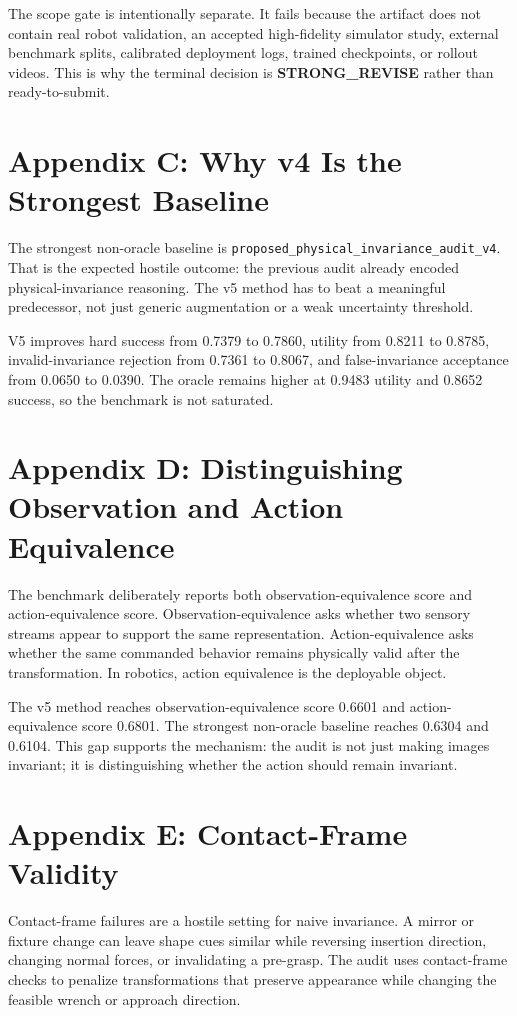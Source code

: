 \documentclass{article}
\begin{document}
The scope gate is intentionally separate. It fails because the artifact does not contain real robot validation, an accepted high-fidelity simulator study, external benchmark splits, calibrated deployment logs, trained checkpoints, or rollout videos. This is why the terminal decision is \textbf{STRONG\_REVISE} rather than ready-to-submit.


\section{Appendix C: Why v4 Is the Strongest Baseline}
The strongest non-oracle baseline is \texttt{proposed\_physical\_invariance\_audit\_v4}. That is the expected hostile outcome: the previous audit already encoded physical-invariance reasoning. The v5 method has to beat a meaningful predecessor, not just generic augmentation or a weak uncertainty threshold.

V5 improves hard success from 0.7379 to 0.7860, utility from 0.8211 to 0.8785, invalid-invariance rejection from 0.7361 to 0.8067, and false-invariance acceptance from 0.0650 to 0.0390. The oracle remains higher at 0.9483 utility and 0.8652 success, so the benchmark is not saturated.


\section{Appendix D: Distinguishing Observation and Action Equivalence}
The benchmark deliberately reports both observation-equivalence score and action-equivalence score. Observation-equivalence asks whether two sensory streams appear to support the same representation. Action-equivalence asks whether the same commanded behavior remains physically valid after the transformation. In robotics, action equivalence is the deployable object.

The v5 method reaches observation-equivalence score 0.6601 and action-equivalence score 0.6801. The strongest non-oracle baseline reaches 0.6304 and 0.6104. This gap supports the mechanism: the audit is not just making images invariant; it is distinguishing whether the action should remain invariant.


\section{Appendix E: Contact-Frame Validity}
Contact-frame failures are a hostile setting for naive invariance. A mirror or fixture change can leave shape cues similar while reversing insertion direction, changing normal forces, or invalidating a pre-grasp. The audit uses contact-frame checks to penalize transformations that preserve appearance while changing the feasible wrench or approach direction.
\end{document}

